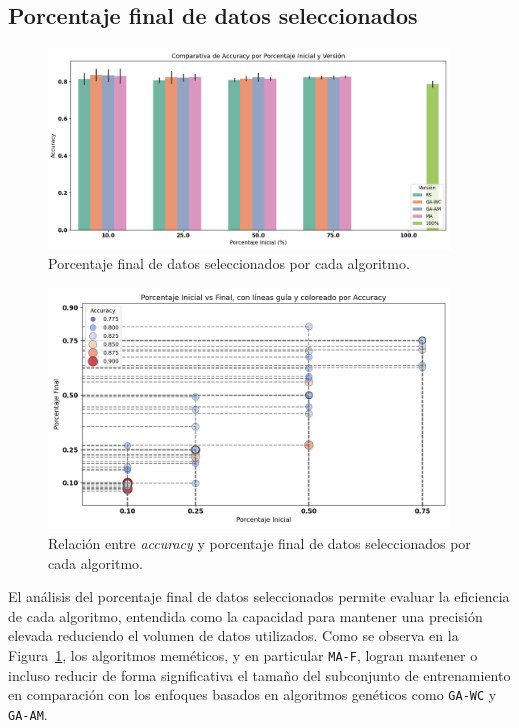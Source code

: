 \subsection{Porcentaje final de datos seleccionados}\label{sec:porcentaje-final-datos-seleccionados}
\begin{figure}[htp]
  \centering
  \includegraphics[width=0.95\textwidth]{imagenes/evaluaciones/final/barplot-por-porcentaje.png}
  \caption{Porcentaje final de datos seleccionados por cada algoritmo.}
  \label{fig:barplot-por-porcentaje}
\end{figure}
\begin{figure}[htp]
  \centering
  \includegraphics[width=0.95\textwidth]{imagenes/evaluaciones/final/scatter.png}
  \caption{Relación entre \textit{accuracy} y porcentaje final de datos seleccionados por cada algoritmo.}
  \label{fig:scatter-final}
\end{figure}El análisis del porcentaje final de datos seleccionados permite evaluar la eficiencia de cada algoritmo,
entendida como la capacidad para mantener una precisión elevada reduciendo el volumen de datos utilizados.
Como se observa en la Figura~\ref{fig:barplot-por-porcentaje}, los algoritmos meméticos, y en particular \texttt{MA-F},
logran mantener o incluso reducir de forma significativa el tamaño del subconjunto de entrenamiento en comparación con
los enfoques basados en algoritmos genéticos como \texttt{GA-WC} y \texttt{GA-AM}.

